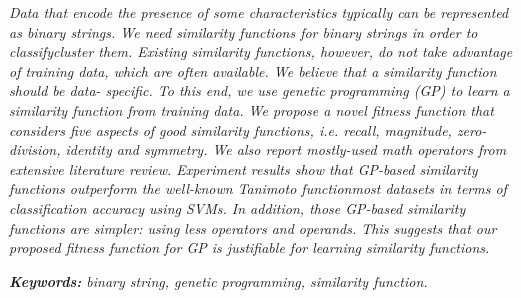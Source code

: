 
\textit{Data that encode the presence of some characteristics typically can be represented
as binary strings. We need similarity functions for binary strings in order to classifycluster them. Existing similarity functions, however, do not take advantage of training
data, which are often available. We believe that a similarity function should be data-
specific. To this end, we use genetic programming (GP) to learn a similarity function from
training data. We propose a novel fitness function that considers five aspects of good
similarity functions, i.e. recall, magnitude, zero-division, identity and symmetry. We also
report mostly-used math operators from extensive literature review. Experiment results
show that GP-based similarity functions outperform the well-known Tanimoto functionmost datasets in terms of classification accuracy using SVMs. In addition, those GP-based
similarity functions are simpler: using less operators and operands. This suggests that our
proposed fitness function for GP is justifiable for learning similarity functions.
}

\vspace{3mm}
\noindent
\textit{\textbf{Keywords:}
binary string, genetic programming, similarity function.
}

